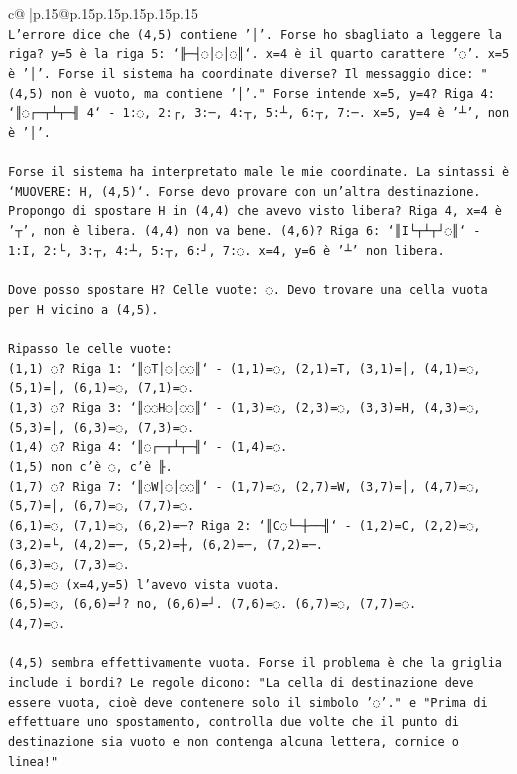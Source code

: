 \documentclass{article}
\begin{document}
{\begin{supertabular}{c@{$\;$}|p{.15\linewidth}@{}p{.15\linewidth}p{.15\linewidth}p{.15\linewidth}p{.15\linewidth}p{.15\linewidth}}
{{{\\ 
\texttt{L'errore dice che (4,5) contiene '│'. Forse ho sbagliato a leggere la riga? y=5 è la riga 5: `╟─┤◌│◌│◌║`. x=4 è il quarto carattere '◌'. x=5 è '│'. Forse il sistema ha coordinate diverse? Il messaggio dice: "(4,5) non è vuoto, ma contiene '│'." Forse intende x=5, y=4? Riga 4: `║◌┌─┬┴┬─╢ 4` {-} 1:◌, 2:┌, 3:─, 4:┬, 5:┴, 6:┬, 7:─. x=5, y=4 è '┴', non è '│'. } \\
\\ 
\texttt{Forse il sistema ha interpretato male le mie coordinate. La sintassi è `MUOVERE: H, (4,5)`. Forse devo provare con un'altra destinazione. Propongo di spostare H in (4,4) che avevo visto libera? Riga 4, x=4 è '┬', non è libera. (4,4) non va bene. (4,6)? Riga 6: `║I└┬┴┬┘◌║` {-} 1:I, 2:└, 3:┬, 4:┴, 5:┬, 6:┘, 7:◌. x=4, y=6 è '┴' non libera. } \\
\\ 
\texttt{Dove posso spostare H? Celle vuote: ◌. Devo trovare una cella vuota per H vicino a (4,5). } \\
\\ 
\texttt{Ripasso le celle vuote:} \\
\texttt{(1,1) ◌? Riga 1: `║◌T│◌│◌◌║` {-} (1,1)=◌, (2,1)=T, (3,1)=│, (4,1)=◌, (5,1)=│, (6,1)=◌, (7,1)=◌.} \\
\texttt{(1,3) ◌? Riga 3: `║◌◌H◌│◌◌║` {-} (1,3)=◌, (2,3)=◌, (3,3)=H, (4,3)=◌, (5,3)=│, (6,3)=◌, (7,3)=◌.} \\
\texttt{(1,4) ◌? Riga 4: `║◌┌─┬┴┬─╢` {-} (1,4)=◌.} \\
\texttt{(1,5) non c'è ◌, c'è ╟.} \\
\texttt{(1,7) ◌? Riga 7: `║◌W│◌│◌◌║` {-} (1,7)=◌, (2,7)=W, (3,7)=│, (4,7)=◌, (5,7)=│, (6,7)=◌, (7,7)=◌.} \\
\texttt{(6,1)=◌, (7,1)=◌, (6,2)=─? Riga 2: `║C◌└─┼──╢` {-} (1,2)=C, (2,2)=◌, (3,2)=└, (4,2)=─, (5,2)=┼, (6,2)=─, (7,2)=─.} \\
\texttt{(6,3)=◌, (7,3)=◌.} \\
\texttt{(4,5)=◌ (x=4,y=5) l'avevo vista vuota.} \\
\texttt{(6,5)=◌, (6,6)=┘? no, (6,6)=┘. (7,6)=◌. (6,7)=◌, (7,7)=◌.} \\
\texttt{(4,7)=◌.} \\
\\ 
\texttt{(4,5) sembra effettivamente vuota. Forse il problema è che la griglia include i bordi? Le regole dicono: "La cella di destinazione deve essere vuota, cioè deve contenere solo il simbolo '◌'." e "Prima di effettuare uno spostamento, controlla due volte che il punto di destinazione sia vuoto e non contenga alcuna lettera, cornice o linea!"} \\
}}}
\end{supertabular}}
\end{document}
